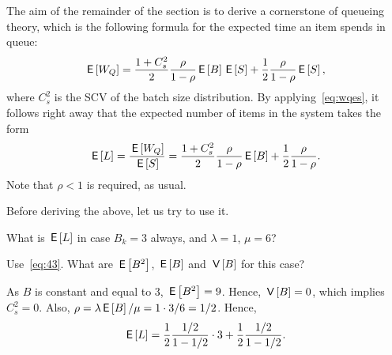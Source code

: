 \begin{comment}
\begin{exercise}\clabel{ex:l-167} 
Use the renewal reward theorem to explain that work arrives at rate $\lambda \E B$.
\begin{hint}
Observe that the total number of items is given by
\begin{equation*}
Y(t)= \sum_{k=1}^{A(t)} B_k.
\end{equation*}
What should you take for the times $\{T_k\}$? 
\end{hint}
\begin{solution}
Take $T_k = A_k$. Then $X_k = Y(A_k) - Y(A_{k-1}) = B_k$. Hence $X = \lim_{n\to\infty} n^{-1} \sum_{k=1}^n X_k = \E B$. Clearly, $Y = \lim_{t\to\infty} Y(t)/t$ is the arrival rate of work. The relation $Y=\lambda X$ implies that the arrival rate of work is $\lambda \E B$. 
\end{solution}
\end{exercise}
\end{comment}


The aim of the remainder of the section is to derive a cornerstone of queueing theory, which is the following formula for the expected time an item spends in queue: 
\begin{equation}\label{eq:32}
\,\mathsf{E}\left[W_{Q}\right] = \frac{1+C_s^2}2 \frac{\rho}{1-\rho} \,\mathsf{E}\left[B\right] \,\mathsf{E}\left[S\right] + \frac12\frac\rho{1-\rho}\,\mathsf{E}\left[S\right],
\end{equation}
where $C_s^2$ is the SCV of the batch size distribution.
By applying~\cref{eq:wqes}, it follows right away that the expected number of items in the system takes the form
\begin{equation}\label{eq:43}
\,\mathsf{E}\left[L\right] =\frac{\,\mathsf{E}\left[W_{Q}\right]}{\,\mathsf{E}\left[S\right]} = 
\frac{1+C_s^2}2 \frac{\rho}{1-\rho} \,\mathsf{E}\left[B\right] + \frac12\frac\rho{1-\rho}.
\end{equation}
Note that $\rho< 1$ is required, as usual.

Before deriving the above, let us try to use it. 



\begin{extra}
 What is $\,\mathsf{E}\left[L\right]$ in case $B_k=3$ always, and $\lambda=1$, $\mu=6$? 
\begin{hint}
Use~\cref{eq:43}. What are $\,\mathsf{E}\left[B^2\right]$, $\,\mathsf{E}\left[B\right]$ and $\,\mathsf{V}\left[B\right]$ for this case?
\end{hint}
\begin{solution}
 As $B$ is constant and equal to 3, $\,\mathsf{E}\left[B^2\right]=9$. Hence, $\,\mathsf{V}\left[B\right]=0$, which implies
 $C_s^2=0$. Also, $\rho=\lambda\,\mathsf{E}\left[B\right]/\mu=1\cdot 3/6=1/2$. Hence,
 \begin{equation*}
 \,\mathsf{E}\left[L\right] = \frac 1 2 \frac{1/2}{1-1/2}\cdot 3 + \frac12\frac{1/2}{1-1/2}.
 \end{equation*}
\end{solution}
\end{extra}

